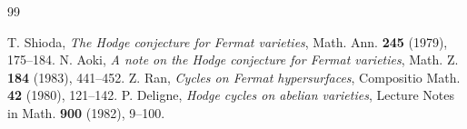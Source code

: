 \documentclass[11pt,a4paper]{article}
\theoremstyle{definition}
\begin{document}
\begin{thebibliography}{99}

 T. Shioda, \emph{The Hodge conjecture for Fermat varieties}, Math. Ann. \textbf{245} (1979), 175--184.
 N. Aoki, \emph{A note on the Hodge conjecture for Fermat varieties}, Math. Z. \textbf{184} (1983), 441--452.
 Z. Ran, \emph{Cycles on Fermat hypersurfaces}, Compositio Math. \textbf{42} (1980), 121--142.
 P. Deligne, \emph{Hodge cycles on abelian varieties}, Lecture Notes in Math. \textbf{900} (1982), 9--100.

\end{thebibliography}
\end{document}

